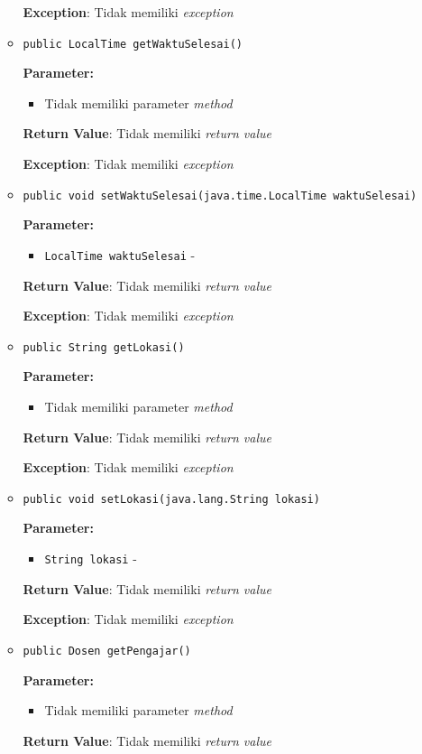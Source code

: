 \documentclass{article}
\begin{document}
\begin{enumerate}
\begin{itemize}
\textbf{Exception}: Tidak memiliki \textit{exception}

\item \texttt{public LocalTime getWaktuSelesai()}

\textbf{Parameter:}
\begin{itemize}
\item Tidak memiliki parameter \textit{method}
\end{itemize}
\textbf{Return Value}: Tidak memiliki \textit{return value}

\textbf{Exception}: Tidak memiliki \textit{exception}

\item \texttt{public void setWaktuSelesai(java.time.LocalTime waktuSelesai)}

\textbf{Parameter:}
\begin{itemize}
\item \texttt{LocalTime waktuSelesai} - 
\end{itemize}
\textbf{Return Value}: Tidak memiliki \textit{return value}

\textbf{Exception}: Tidak memiliki \textit{exception}

\item \texttt{public String getLokasi()}

\textbf{Parameter:}
\begin{itemize}
\item Tidak memiliki parameter \textit{method}
\end{itemize}
\textbf{Return Value}: Tidak memiliki \textit{return value}

\textbf{Exception}: Tidak memiliki \textit{exception}

\item \texttt{public void setLokasi(java.lang.String lokasi)}

\textbf{Parameter:}
\begin{itemize}
\item \texttt{String lokasi} - 
\end{itemize}
\textbf{Return Value}: Tidak memiliki \textit{return value}

\textbf{Exception}: Tidak memiliki \textit{exception}

\item \texttt{public Dosen getPengajar()}

\textbf{Parameter:}
\begin{itemize}
\item Tidak memiliki parameter \textit{method}
\end{itemize}
\textbf{Return Value}: Tidak memiliki \textit{return value}


\end{itemize}
\end{enumerate}
\end{document}
